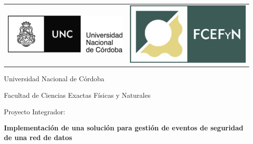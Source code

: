 \begin{titlepage}

    \begin{center}

        \begin{tabular}{ p{} p{} }
        		\centering\includegraphics[height=0.15\textwidth]{./imagenes_caratula/unc_logo.jpg} &
        		\centering\includegraphics[height=0.15\textwidth]{./imagenes_caratula/logo_fcefyn_nuevo.jpg}
        \end{tabular}
        
        \vspace*{30mm}
        \begin{Huge}
            Universidad Nacional de Córdoba \\
        \end{Huge}
        
        \vspace*{10mm}
        \begin{Large}
            Facultad de Ciencias Exactas Físicas y Naturales \\
        \end{Large}
        
        \vspace*{20mm}
        \begin{large}
            Proyecto Integrador: \\
        \end{large}
        
        \vspace*{5mm}
        \begin{Large}
            \textbf{Implementación de una solución para gestión de eventos de seguridad de una red de datos} \\
        \end{Large}
        

\end{center}
\end{titlepage}
